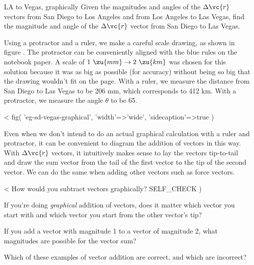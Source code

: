 \begin{eg}{LA to Vegas, graphically}\label{eg:sd-vegas-graphical}
\egquestion Given the magnitudes and angles of the $\Delta \vc{r}$
vectors from San Diego to Los Angeles and from Los Angeles
to Las Vegas, find the magnitude and angle of the $\Delta \vc{r}$
vector from San Diego to Las Vegas.

\eganswer Using a protractor and a ruler, we make a careful
scale drawing, as shown in figure . 
The protractor can be conveniently aligned with the blue rules on
the notebook paper.
A scale of 
$1\ \zu{mm}\rightarrow 2\ \zu{km}$ was chosen for this solution because
it was as big as possible (for accuracy) without being so big that the
drawing wouldn't fit on the page. With a
ruler, we measure the distance from San Diego to Las Vegas
to be 206 mm, which corresponds to 412 km. With a protractor,
we measure the angle $\theta $ to be 65\degunit.
\end{eg}

<%
  fig(
    'eg-sd-vegas-graphical',
    {
      'width'=>'wide',
      'sidecaption'=>true
    }
  )

Even when we don't intend to do an actual graphical
calculation with a ruler and protractor, it can be
convenient to diagram the addition of vectors in this way.
With $\Delta \vc{r}$ vectors, it intuitively makes sense to lay
the vectors tip-to-tail and draw the sum vector from the
tail of the first vector to the tip of the second vector. We
can do the same when adding other vectors such as force vectors.

<%
How would you subtract vectors graphically?
  SELF_CHECK
  ) %

\startdqs

\begin{dq}
If you're doing \emph{graphical} addition of vectors,
does it matter which vector you start with and which vector
you start from the other vector's tip?
\end{dq}

\begin{dq}
If you add a vector with magnitude 1 to a vector of
magnitude 2, what magnitudes are possible for the vector sum?
\end{dq}

\begin{dq}
Which of these examples of vector addition are correct,
and which are incorrect?
\end{dq}

